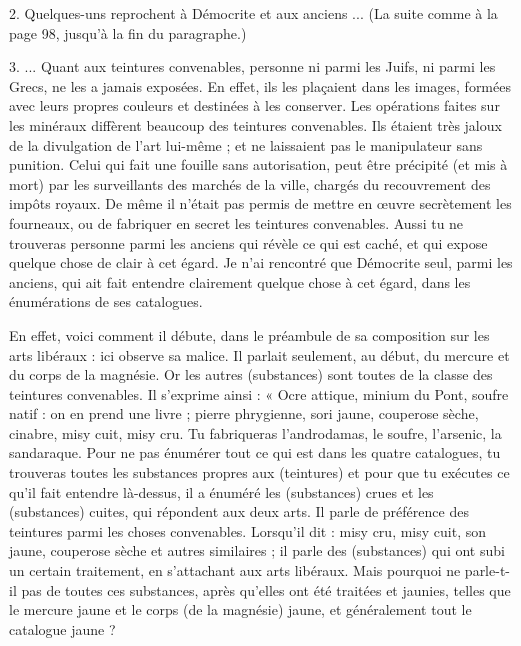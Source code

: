 \documentclass[landscape, a4paper, 11pt, oneside, polutonikogreek, french]{article}
\begin{document}
2. Quelques-uns reprochent à Démocrite et aux anciens ... (La suite comme à la page 98, jusqu'à la fin du paragraphe.)

3. ... Quant aux teintures convenables, personne ni parmi les Juifs, ni parmi les Grecs, ne les a jamais exposées. En effet, ils les plaçaient dans les images, formées avec leurs propres couleurs et destinées à les conserver. Les opérations faites sur les minéraux diffèrent beaucoup des teintures convenables. Ils étaient très jaloux de la divulgation de l'art lui-même ; et ne laissaient pas le manipulateur sans punition. Celui qui fait une fouille sans autorisation, peut être précipité (et mis à mort) par les surveillants des marchés de la ville, chargés du recouvrement des impôts royaux. De même il n'était pas permis de mettre en œuvre secrètement les fourneaux, ou de fabriquer en secret les teintures convenables. Aussi tu ne trouveras personne parmi les anciens qui révèle ce qui est caché, et qui expose quelque chose de clair à cet égard. Je n'ai rencontré que Démocrite seul, parmi les anciens, qui ait fait entendre clairement quelque chose à cet égard, dans les énumérations de ses catalogues.

En effet, voici comment il débute, dans le préambule de sa composition sur les arts libéraux : ici observe sa malice. Il parlait seulement, au début, du mercure et du corps de la magnésie. Or les autres (substances) sont toutes de la classe des teintures convenables. Il s'exprime ainsi : « Ocre attique, minium du Pont, soufre natif : on en prend une livre ; pierre phrygienne, sori jaune, couperose sèche, cinabre, misy cuit, misy cru. Tu fabriqueras l'androdamas, le soufre, l'arsenic, la sandaraque. Pour ne pas énumérer tout ce qui est dans les quatre catalogues, tu trouveras toutes les substances propres aux (teintures) et pour que tu exécutes ce qu'il fait entendre là-dessus, il a énuméré les (substances) crues et les (substances) cuites, qui répondent aux deux arts. Il parle de préférence des teintures parmi les choses convenables. Lorsqu'il dit : misy cru, misy cuit, son jaune, couperose sèche et autres similaires ; il parle des (substances) qui ont subi un certain traitement, en s'attachant aux arts libéraux. Mais pourquoi ne parle-t-il pas de toutes ces substances, après qu'elles ont été traitées et jaunies, telles que le mercure jaune et le corps (de la magnésie) jaune, et généralement tout le catalogue jaune ?
\end{document}
